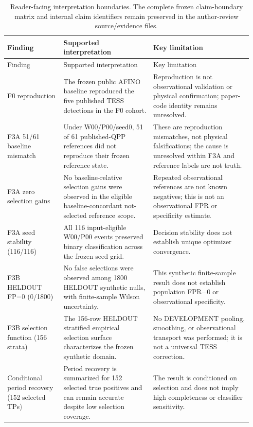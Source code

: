 \begin{longtable}{@{}>{\RaggedRight\arraybackslash}p{}>{\RaggedRight\arraybackslash}p{}>{\RaggedRight\arraybackslash}p{}@{}}
\caption{Reader-facing interpretation boundaries. The complete frozen claim-boundary matrix and internal claim identifiers remain preserved in the author-review source/evidence files.}\label{tab:claim_boundaries}\\
\toprule
Finding & Supported interpretation & Key limitation \\
\midrule
\endfirsthead
\toprule
Finding & Supported interpretation & Key limitation \\
\midrule
\endhead
F0 reproduction & The frozen public AFINO baseline reproduced the five published TESS detections in the F0 cohort. & Reproduction is not observational validation or physical confirmation; paper-code identity remains unresolved. \\
F3A 51/61 baseline mismatch & Under W00/P00/seed0, 51 of 61 published-QPP references did not reproduce their frozen reference state. & These are reproduction mismatches, not physical falsifications; the cause is unresolved within F3A and reference labels are not truth. \\
F3A zero selection gains & No baseline-relative selection gains were observed in the eligible baseline-concordant not-selected reference scope. & Repeated observational references are not known negatives; this is not an observational FPR or specificity estimate. \\
F3A seed stability (116/116) & All 116 input-eligible W00/P00 events preserved binary classification across the frozen seed grid. & Decision stability does not establish unique optimizer convergence. \\
F3B HELDOUT FP=0 (0/1800) & No false selections were observed among 1800 HELDOUT synthetic nulls, with finite-sample Wilson uncertainty. & This synthetic finite-sample result does not establish population FPR=0 or observational specificity. \\
F3B selection function (156 strata) & The 156-row HELDOUT stratified empirical selection surface characterizes the frozen synthetic domain. & No DEVELOPMENT pooling, smoothing, or observational transport was performed; it is not a universal TESS correction. \\
Conditional period recovery (152 selected TPs) & Period recovery is summarized for 152 selected true positives and can remain accurate despite low selection coverage. & The result is conditioned on selection and does not imply high completeness or classifier sensitivity. \\

\end{longtable}
